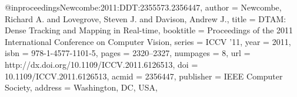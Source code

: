 @inproceedings{Newcombe:2011:DDT:2355573.2356447,
 author = {Newcombe, Richard A. and Lovegrove, Steven J. and Davison, Andrew J.},
 title = {DTAM: Dense Tracking and Mapping in Real-time},
 booktitle = {Proceedings of the 2011 International Conference on Computer Vision},
 series = {ICCV '11},
 year = {2011},
 isbn = {978-1-4577-1101-5},
 pages = {2320--2327},
 numpages = {8},
 url = {http://dx.doi.org/10.1109/ICCV.2011.6126513},
 doi = {10.1109/ICCV.2011.6126513},
 acmid = {2356447},
 publisher = {IEEE Computer Society},
 address = {Washington, DC, USA},
} 